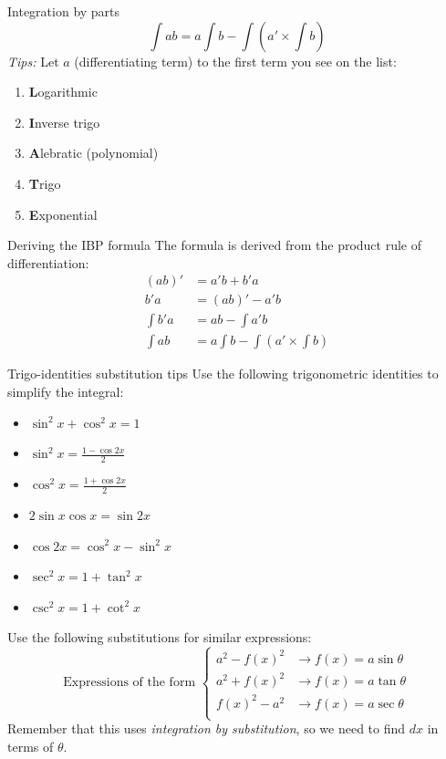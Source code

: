 \label{sec:intpart}
\begin{theorem}
    {Integration by parts}
    \[\int ab=a\int b-\int (a'\times \int b)\]
    \emph{Tips:}
    Let $a$ (differentiating term) to the first term you see on the list:
    \begin{enumerate}
        \item \textbf{L}ogarithmic
        \item \textbf{I}nverse trigo
        \item \textbf{A}lebratic (polynomial)
        \item \textbf{T}rigo
        \item \textbf{E}xponential
    \end{enumerate}
\end{theorem}
\begin{knBox}
    {Deriving the IBP formula}
    The formula is derived from the product rule of differentiation:
    \begin{align*}
        (ab)'    & = a'b + b'a                     \\
        b'a      & = (ab)' - a'b                   \\
        \int b'a & = ab - \int a'b                 \\
        \int ab  & =a\int b-\int (a'\times \int b)
    \end{align*}
\end{knBox}

\label{sec:inttrigo}
\begin{knBox}
    {Trigo-identities substitution tips}
    Use the following trigonometric identities to simplify the integral:
    \begin{itemize}
        \item $\sin^2x+\cos^2x=1$
        \item $\sin^2x=\frac{1-\cos2x}{2}$
        \item $\cos^2x=\frac{1+\cos2x}{2}$
        \item $2\sin x\cos x=\sin2x$
        \item $\cos2x=\cos^2x-\sin^2x$
        \item $\sec^2x=1+\tan^2x$
        \item $\csc^2x=1+\cot^2x$
    \end{itemize}
    Use the following substitutions for similar expressions:
    \[
        \text{Expressions of the form }
        \begin{cases}
            a^2-f(x)^2 & \to f(x)=a\sin\theta \\
            a^2+f(x)^2 & \to f(x)=a\tan\theta \\
            f(x)^2-a^2 & \to f(x)=a\sec\theta \\
        \end{cases}
    \]
    Remember that this uses \emph{integration by substitution}, so we need to find $dx$ in terms of $\theta$.
\end{knBox}

